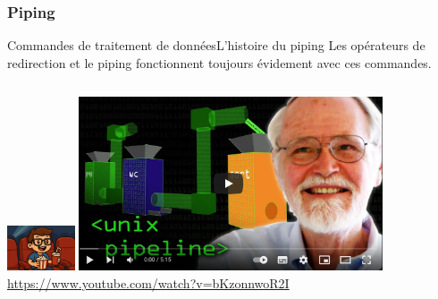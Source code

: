 \documentclass{beamer}
\begin{document}
    \subsubsection{Piping}\label{subsubsec:piping}
    \begin{frame}{Commandes de traitement de données}{L'histoire du piping}
        Les opérateurs de redirection et le piping fonctionnent toujours évidement avec ces commandes.
        \bigbreak
        \begin{columns}
            \centering
            \includegraphics[width=2cm]{image/seat-and-watch}
            \includegraphics[width=9cm]{image/kernighan-piping-video} \\ \url{https://www.youtube.com/watch?v=bKzonnwoR2I} \\
        \end{columns}
    \end{frame}
\end{document}
